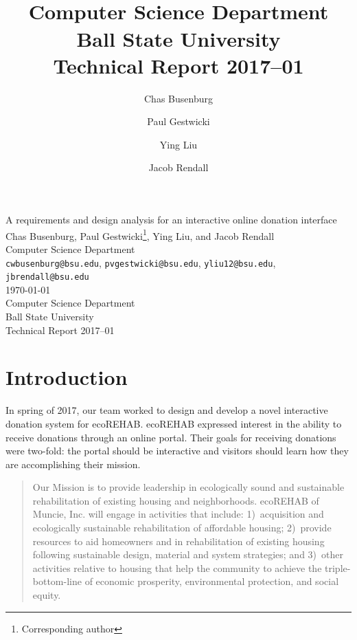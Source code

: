 \documentclass[letter]{article}
\title{\\
  Computer Science Department\\
  Ball State University\\
  Technical Report 2017--01}
\author{
  Chas Busenburg
  \and
  Paul Gestwicki
  \and
  Ying Liu
  \and
  Jacob Rendall}
\begin{document}
\begin{centering}
{\Large A requirements and design analysis for an interactive online donation interface}\\
\vspace{0.5cm}
Chas Busenburg, Paul Gestwicki\footnote{Corresponding author}, Ying Liu, and Jacob Rendall\\
Computer Science Department\\
\texttt{cwbusenburg@bsu.edu}, 
\texttt{pvgestwicki@bsu.edu},
\texttt{yliu12@bsu.edu},
\texttt{jbrendall@bsu.edu}\\
\vspace{0.5cm}
\today\\
\vspace{0.5cm}
Computer Science Department\\
Ball State University\\
Technical Report 2017--01\\
\end{centering}

\section*{Introduction}

In spring of 2017, our team worked to design and develop a novel interactive
donation system for ecoREHAB. ecoREHAB expressed interest in the ability
to receive donations through an online portal. Their goals for
receiving donations were two-fold: the portal should be interactive and visitors should
learn how they are accomplishing their mission.


\begin{quote}
  Our Mission is to provide leadership in ecologically sound and
  sustainable rehabilitation of existing housing and
  neighborhoods. ecoREHAB of Muncie, Inc. will engage in activities
  that include: 1)~acquisition and ecologically sustainable
  rehabilitation of affordable housing; 2)~provide resources to aid
  homeowners and in rehabilitation of existing housing following
  sustainable design, material and system strategies; and 3)~other
  activities relative to housing that help the community to achieve
  the triple-bottom-line of economic prosperity, environmental
  protection, and social equity.
\end{quote}
\end{document}
